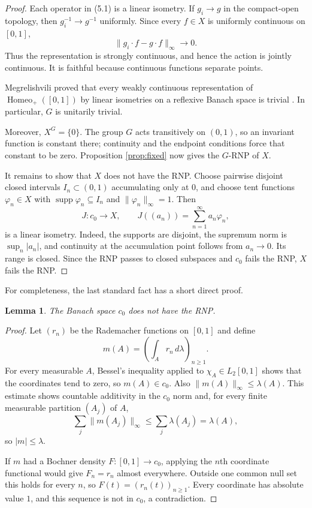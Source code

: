 \documentclass[11pt]{article}
\newtheorem{lemma}[theorem]{Lemma}
\theoremstyle{remark}
\newcommand{\Homeo}{\operatorname{Homeo}}
\newcommand{\supp}{\operatorname{supp}}
\begin{document}
\begin{proof}
Each operator in (5.1) is a linear isometry.  If $g_i\to g$ in the
compact-open topology, then $g_i^{-1}\to g^{-1}$ uniformly.  Since every
$f\in X$ is uniformly continuous on $[0,1]$,
\[
 \|g_i\cdot f-g\cdot f\|_\infty\longrightarrow0.
\]
Thus the representation is strongly continuous, and hence the action is
jointly continuous.  It is faithful because continuous functions separate
points.

Megrelishvili proved that every weakly continuous representation of
$\Homeo_+([0,1])$ by linear isometries on a reflexive Banach space is trivial
\cite{Megrelishvili}.  In particular, $G$ is unitarily trivial.

Moreover, $X^G=\{0\}$.  The group $G$ acts transitively on $(0,1)$, so an
invariant function is constant there; continuity and the endpoint conditions
force that constant to be zero.  Proposition \ref{prop:fixed} now gives the
$G$-RNP of $X$.

It remains to show that $X$ does not have the RNP.  Choose pairwise disjoint
closed intervals $I_n\subset(0,1)$ accumulating only at $0$, and choose tent
functions $\varphi_n\in X$ with
$\supp\varphi_n\subseteq I_n$ and $\|\varphi_n\|_\infty=1$.  Then
\[
 J:c_0\longrightarrow X,
 \qquad J((a_n))=\sum_{n=1}^\infty a_n\varphi_n,
\]
is a linear isometry.  Indeed, the supports are disjoint, the supremum norm
is $\sup_n|a_n|$, and continuity at the accumulation point follows from
$a_n\to0$.  Its range is closed.  Since the RNP passes to closed subspaces
and $c_0$ fails the RNP, $X$ fails the RNP.
\end{proof}

For completeness, the last standard fact has a short direct proof.

\begin{lemma}\label{lem:c0}
The Banach space $c_0$ does not have the RNP.
\end{lemma}

\begin{proof}
Let $(r_n)$ be the Rademacher functions on $[0,1]$ and define
\[
 m(A)=\left(\int_A r_n\,d\lambda\right)_{n\geq1}.
\]
For every measurable $A$, Bessel's inequality applied to
$\chi_A\in L_2[0,1]$ shows that the coordinates tend to zero, so
$m(A)\in c_0$.  Also $\|m(A)\|_\infty\leq\lambda(A)$.  This estimate shows
countable additivity in the $c_0$ norm and, for every finite measurable
partition $(A_j)$ of $A$,
\[
 \sum_j\|m(A_j)\|_\infty\leq\sum_j\lambda(A_j)=\lambda(A),
\]
so $|m|\leq\lambda$.

If $m$ had a Bochner density $F:[0,1]\to c_0$, applying the $n$th coordinate
functional would give $F_n=r_n$ almost everywhere.  Outside one common null
set this holds for every $n$, so
$F(t)=(r_n(t))_{n\geq1}$.  Every coordinate has absolute value $1$, and this
sequence is not in $c_0$, a contradiction.
\end{proof}
\end{document}
